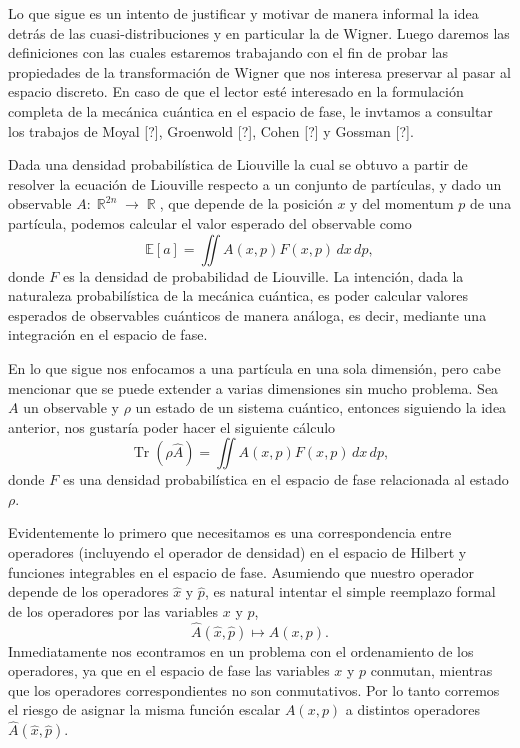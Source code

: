 \documentclass[a4paper]{report}
\DeclareMathOperator{\R}{\mathbb{R}}
\DeclareMathOperator{\Tr}{Tr}
\begin{document}
  Lo que sigue es un intento de justificar y motivar de
  manera informal la idea detrás de las cuasi-distribuciones
  y en particular la de Wigner. Luego daremos las
  definiciones con las cuales estaremos trabajando con el
  fin de probar las propiedades de la transformación de
  Wigner que nos interesa preservar al pasar al espacio
  discreto. En caso de que el lector esté interesado en la
  formulación completa de la mecánica cuántica en el espacio
  de fase, le invtamos a consultar los trabajos de Moyal
  [?], Groenwold [?], Cohen [?] y Gossman [?].

  Dada una densidad probabilística de Liouville la cual se
  obtuvo a partir de resolver la ecuación de Liouville
  respecto a un conjunto de partículas, y dado un observable
  $A : \R^{2n} \to \R$, que depende de la posición $x$ y del
  momentum $p$ de una partícula, podemos calcular el valor
  esperado del observable como
  \begin{equation}
    \mathbb E[a]
    = \iint A(x,p) F(x,p) \, dx \, dp,
  \end{equation}
  donde $F$ es la densidad de probabilidad de Liouville. La
  intención, dada la naturaleza probabilística de la mecánica
  cuántica, es poder calcular valores esperados
  de observables cuánticos de manera análoga, es decir,
  mediante una integración en el espacio de fase. 

  En lo que sigue nos enfocamos a una partícula en una sola
  dimensión, pero cabe mencionar que se puede extender a
  varias dimensiones sin mucho problema. Sea $A$ un
  observable y $\rho$ un estado de un sistema cuántico,
  entonces siguiendo la idea anterior, nos gustaría poder
  hacer el siguiente cálculo
  \begin{equation}
    \Tr\left(\rho \hat{A}\right)
    = \iint A(x,p)F(x,p) \, dx \, dp,
  \end{equation}
  donde $F$ es una densidad probabilística en el espacio de
  fase relacionada al estado $\rho$.

  Evidentemente lo primero que necesitamos es una
  correspondencia entre operadores (incluyendo el operador
  de densidad) en el espacio de Hilbert y funciones
  integrables en el espacio de fase. Asumiendo que nuestro
  operador depende de los operadores $\hat{x}$ y $\hat{p}$,
  es natural intentar el simple reemplazo formal de los
  operadores por las variables $x$ y $p$,
  \[
    \hat{A}(\hat{x},\hat{p})
    \mapsto 
    A(x,p).
  \] 
  Inmediatamente nos econtramos en un problema con el
  ordenamiento de los operadores, ya que en el espacio de
  fase las variables $x$ y $p$ conmutan, mientras que los
  operadores correspondientes no son conmutativos. Por lo
  tanto corremos el riesgo de asignar la misma función
  escalar $A(x,p)$ a distintos operadores
  $\hat{A}(\hat{x},\hat{p})$.
\end{document}
